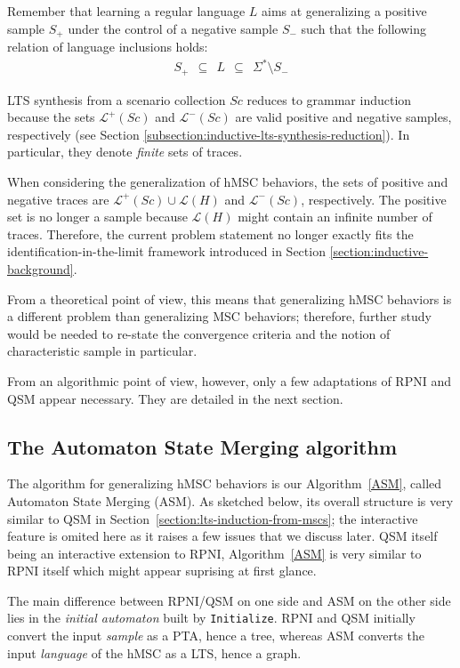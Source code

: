 Remember that learning a regular language $L$ aims at generalizing a positive sample $S_+$ under the control of a negative sample $S_-$ such that the following relation of language inclusions holds:
\begin{align}
S_+~~\subseteq~~L~~\subseteq~~\Sigma^*\setminus S_-
\end{align}

LTS synthesis from a scenario collection $Sc$ reduces to grammar induction because the sets $\mathcal{L}^+(Sc)$ and $\mathcal{L}^-(Sc)$ are valid positive and negative samples, respectively (see Section \ref{subsection:inductive-lts-synthesis-reduction}). In particular, they denote \emph{finite} sets of traces.

When considering the generalization of hMSC behaviors, the sets of positive and negative traces are $\mathcal{L}^+(Sc) \cup \mathcal{L}(H)$ and $\mathcal{L}^-(Sc)$, respectively. The positive set is no longer a sample because $\mathcal{L}(H)$ might contain an infinite number of traces. Therefore, the current problem statement no longer exactly fits the identification-in-the-limit framework introduced in Section \ref{section:inductive-background}. 

From a theoretical point of view, this means that generalizing hMSC behaviors is a different problem than generalizing MSC behaviors; therefore, further study would be needed to re-state the convergence criteria and the notion of characteristic sample in particular. 

From an algorithmic point of view, however, only a few adaptations of RPNI and QSM appear necessary. They are detailed in the next section.

\subsection{The Automaton State Merging algorithm\label{subsection:automaton-state-merging}}

The algorithm for generalizing hMSC behaviors is our Algorithm~\ref{ASM}, called Automaton State Merging (ASM). As sketched below, its overall structure is very similar to QSM in Section~\ref{section:lts-induction-from-mscs}; the interactive feature is omited here as it raises a few issues that we discuss later. QSM itself being an interactive extension to RPNI, Algorithm~\ref{ASM} is very similar to RPNI itself which might appear suprising at first glance.

The main difference between RPNI/QSM on one side and ASM on the other side lies in the \emph{initial automaton} built by \texttt{Initialize}. RPNI and QSM initially convert the input \emph{sample} as a PTA, hence a tree, whereas ASM converts the input \emph{language} of the hMSC as a LTS, hence a graph. 

